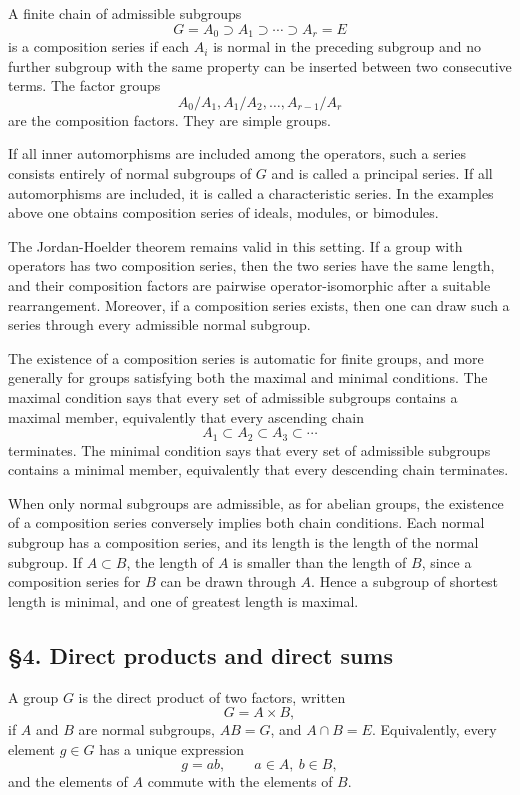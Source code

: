 \documentclass[11pt]{article}
\begin{document}
A finite chain of admissible subgroups \[
  G=A_0\supset A_1\supset\cdots\supset A_r=E
\] is a composition series if each \(A_i\) is normal in the preceding
subgroup and no further subgroup with the same property can be inserted
between two consecutive terms. The factor groups \[
  A_0/A_1,
  A_1/A_2,
  \ldots,
  A_{r-1}/A_r
\] are the composition factors. They are simple groups.

If all inner automorphisms are included among the operators, such a
series consists entirely of normal subgroups of \(G\) and is called a
principal series. If all automorphisms are included, it is called a
characteristic series. In the examples above one obtains composition
series of ideals, modules, or bimodules.

The Jordan-Hoelder theorem remains valid in this setting. If a group
with operators has two composition series, then the two series have the
same length, and their composition factors are pairwise
operator-isomorphic after a suitable rearrangement. Moreover, if a
composition series exists, then one can draw such a series through every
admissible normal subgroup.

The existence of a composition series is automatic for finite groups,
and more generally for groups satisfying both the maximal and minimal
conditions. The maximal condition says that every set of admissible
subgroups contains a maximal member, equivalently that every ascending
chain \[
  A_1\subset A_2\subset A_3\subset\cdots
\] terminates. The minimal condition says that every set of admissible
subgroups contains a minimal member, equivalently that every descending
chain terminates.

When only normal subgroups are admissible, as for abelian groups, the
existence of a composition series conversely implies both chain
conditions. Each normal subgroup has a composition series, and its
length is the length of the normal subgroup. If \(A\subset B\), the
length of \(A\) is smaller than the length of \(B\), since a composition
series for \(B\) can be drawn through \(A\). Hence a subgroup of
shortest length is minimal, and one of greatest length is maximal.

\subsection{§4. Direct products and direct
sums}\label{direct-products-and-direct-sums}

A group \(G\) is the direct product of two factors, written \[
  G=A\times B,
\] if \(A\) and \(B\) are normal subgroups, \(AB=G\), and \(A\cap B=E\).
Equivalently, every element \(g\in G\) has a unique expression \[
  g=ab,
  \qquad a\in A,\ b\in B,
\] and the elements of \(A\) commute with the elements of \(B\).
\end{document}
